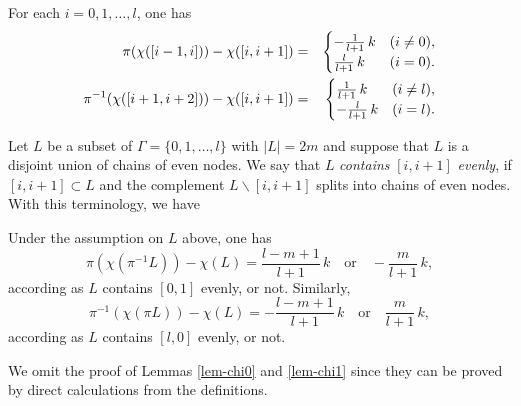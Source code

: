 \begin{lem} For each $i=0,1,\ldots,l$, one has
\begin{eqnarray}
\pi(\chi([i-1,i]))-\chi([i,i+1]) &=&\begin{cases}
-\frac{1}{l+1}\, k & (i\ne 0),
\\
\frac{l}{l+1}\,k & (i=0).
\end{cases}\\
\pi^{-1}(\chi([i+1,i+2]))-\chi([i,i+1]) &=&\begin{cases}
\frac{1}{l+1}\, k & (i\ne l),
\\
-\frac{l}{l+1}\,k & (i=l).
\end{cases}
\notag
\end{eqnarray}
\end{lem}

\noindent
Let $L$ be a subset of $\Gamma=\{0,1,\ldots,l\}$ with $|L|=2m$ 
and suppose that $L$ is a disjoint union of chains of even nodes. 
We say that $L$ {\em contains} $[i,i+1]$ {\em evenly}, if $[i,i+1]\subset L$ and 
the complement $L\backslash[i,i+1]$ splits into chains of even nodes. 
With this terminology, we have 
\begin{lem} 
Under the assumption on $L$ above, one has 
\begin{equation}
\pi(\chi(\pi^{-1} L))-\chi(L)= \frac{l-m+1}{l+1}\,k \quad \text{or}\quad -\frac{m}{l+1}\,k,
\end{equation}
according as $L$ contains $[0,1]$ evenly, or not.  Similarly, 
\begin{equation}
\pi^{-1}(\chi(\pi L))-\chi(L)= -\frac{l-m+1}{l+1}\,k \quad\text{or}\quad \frac{m}{l+1}\,k,
\end{equation}
according as $L$ contains $[l,0]$ evenly, or not. 
\end{lem} 

\noindent
We omit the proof of Lemmas \ref{lem-chi0} and \ref{lem-chi1} since 
they can be proved by direct calculations from the definitions. 


